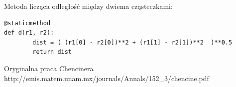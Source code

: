 \documentclass[10pt,a4paper]{article}
\begin{document}
Metoda licząca odległość między dwiema cząsteczkami:
\begin{lstlisting}
@staticmethod
def d(r1, r2):
        dist = ( (r1[0] - r2[0])**2 + (r1[1] - r2[1])**2  )**0.5
        return dist
\end{lstlisting}	
	
	
\begin{thebibliography}{}
	 Oryginalna praca Chencinera 
	http://emis.matem.unam.mx/journals/Annals/152{\_}3/chencine.pdf 
\end{thebibliography}
	
\end{document}
